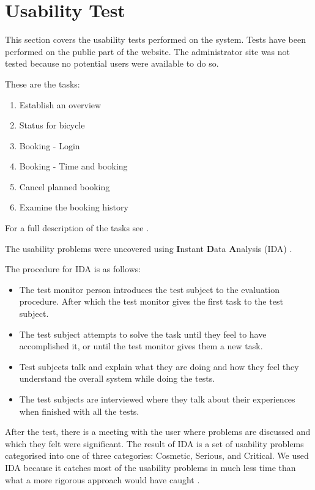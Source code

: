 \section{Usability Test}
This section covers the usability tests performed on the system.
Tests have been performed on the public part of the website.
The administrator site was not tested because no potential users were available to do so.

These are the tasks:

\begin{enumerate}
\item Establish an overview
\item Status for bicycle
\item Booking - Login
\item Booking - Time and booking
\item Cancel planned booking
\item Examine the booking history
\end{enumerate}
For a full description of the tasks see .

The usability problems were uncovered using \textbf{I}nstant \textbf{D}ata \textbf{A}nalysis (IDA) \citep{misc:usabilitytest}.

The procedure for IDA is as follows:

\begin{itemize}
\item The test monitor person introduces the test subject to the evaluation procedure. After which the test monitor gives the first task to the test subject.
\item The test subject attempts to solve the task until they feel to have accomplished it, or until the test monitor gives them a new task.
\item Test subjects talk and explain what they are doing and how they feel they understand the overall system while doing the tests.
\item The test subjects are interviewed where they talk about their experiences when finished with all the tests.
\end{itemize}

After the test, there is a meeting with the user where problems are discussed and which they felt were significant.
The result of IDA is a set of usability problems categorised into one of three categories: Cosmetic, Serious, and Critical.
We used IDA because it catches most of the usability problems in much less time than what a more rigorous approach would have caught \citep{misc:usabilitytest}.

